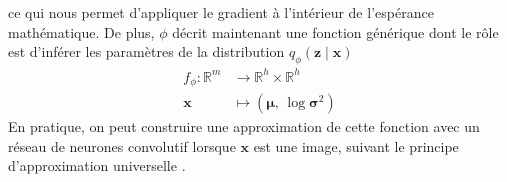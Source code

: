 ce qui nous permet d'appliquer le gradient à l'intérieur de l'espérance mathématique.
De plus, $\phi$ décrit maintenant une fonction générique dont le rôle est d'inférer les 
paramètres de la distribution $q_\phi(\mathbf{z} \mid \mathbf{x})$
\begin{equation}
        \begin{aligned}
                f_\phi: \mathbb{R}^{m} &\rightarrow \mathbb{R}^{h} \times \mathbb{R}^{h}\\ \mathbf{x} &\mapsto (\boldsymbol{\mu},\, \log \boldsymbol{\sigma}^{2})
        \end{aligned}
\end{equation} 
En pratique, on peut construire une approximation de 
cette fonction avec un réseau de neurones convolutif lorsque $\mathbf{x}$ est une image, 
suivant le principe d'approximation universelle \citep{Cybenko1989,Hornik1991}. 

